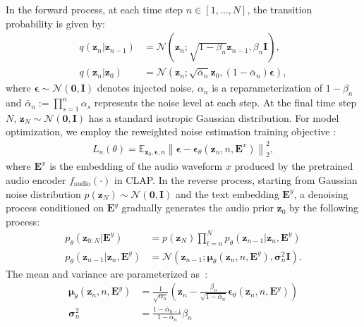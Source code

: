 \documentclass{article}
\begin{document}
In the forward process, at each time step $n\in [1,\dots,N]$, the transition probability is given by:
\begin{align}
q(\boldsymbol{z}_{n}|\boldsymbol{z}_{n-1})&=\mathcal{N}(\boldsymbol{z}_{n};\sqrt{1-\beta_{n}}\boldsymbol{z}_{n-1},\beta_{n}\boldsymbol{I}), \\
\label{forwardprocess}
q(\boldsymbol{z}_{n}|\boldsymbol{z}_{0})&=\mathcal  N(\boldsymbol{z}_{n};\sqrt{\bar{\alpha}_{n}}\boldsymbol{z}_{0},(1-\bar{\alpha}_{n})\boldsymbol{\epsilon}),
\end{align} 
where $\boldsymbol{\epsilon}\sim\mathcal N(\boldsymbol{0},\boldsymbol{I})$ denotes injected noise, $\alpha_{n}$ is a reparameterization of $1-\beta_{n}$ and $\bar{\alpha}_{n}:=\prod_{s=1}^{n}\alpha_{s}$ represents the noise level at each step. 
At the final time step $N$, $\boldsymbol{z}_{N}\sim\mathcal N(\boldsymbol{0},\boldsymbol{I})$ has a standard isotropic Gaussian distribution.
For model optimization, we employ the reweighted noise estimation training objective \cite{DDPM,DiffWave,rombach2022high}:
\begin{align}
\label{trainingobjective}
L_{n}(\theta)=\mathbb{E}_{\boldsymbol{z}_{0},\boldsymbol{\epsilon},n}\left \| \boldsymbol{\epsilon} - \boldsymbol{\epsilon}_{\theta}(\boldsymbol{z}_{n},n,\boldsymbol{E}^{x}) \right\|^2_{2},
\end{align}
where $\boldsymbol{E}^{x}$ is the embedding of the audio waveform $x$ produced by the pretrained audio encoder $f_{\text{audio}}(\cdot)$ in CLAP. In the reverse process, starting from Gaussian noise distribution $p(\boldsymbol{z}_{N})\sim\mathcal N(\boldsymbol{0},\boldsymbol{I})$ and the text embedding $\boldsymbol{E}^{y}$, a denoising process conditioned on $\boldsymbol{E}^{y}$ gradually generates the audio prior $\boldsymbol{z}_{0}$ by the following process:
\begin{align}
p_{\theta}(\boldsymbol{z}_{0:N}|\boldsymbol{E}^{y})&=p(\boldsymbol{z}_{N})\prod_{t=n}^{N}p_{\theta}(\boldsymbol{z}_{n-1}|\boldsymbol{z}_{n},\boldsymbol{E}^{y}) \\
\label{singlereversestep}
p_{\theta}(\boldsymbol{z}_{n-1}|\boldsymbol{z}_{n},\boldsymbol{E}^{y})&=\mathcal{N}(\boldsymbol{z}_{n-1};\boldsymbol{\mu}_{\theta}(\boldsymbol{z}_{n},n,\boldsymbol{E}^{y}),\boldsymbol{\sigma}_{n}^{2}\boldsymbol{I}).
\end{align}
The mean and variance are parameterized as~\cite{DDPM}: 
\begin{align}
\boldsymbol{\mu}_{\theta}(\boldsymbol{z}_{n},n,\boldsymbol{E}^{y})&=\frac{1}{\sqrt{\alpha_{n}}}(\boldsymbol{z}_{n}-\frac{\beta_{n}}{\sqrt{1-\bar{\alpha}_{n}}}\boldsymbol{\epsilon}_{\theta}(\boldsymbol{z}_{n},n,\boldsymbol{E}^{y})) \\
\boldsymbol{\sigma}_{n}^{2}&=\frac{1-\bar{\alpha}_{n-1}}{1-\bar{\alpha}_{n}}\beta_{n}
\end{align}
\end{document}
